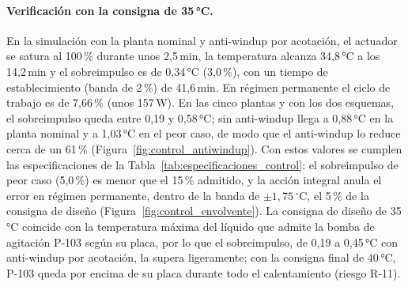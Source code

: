 \paragraph{Verificación con la consigna de 35\,°C.} En la simulación con la planta nominal y anti-windup por acotación, el actuador se satura al 100\,\% durante unos 2,5\,min, la temperatura alcanza 34,8\,°C a los 14,2\,min y el sobreimpulso es de 0,34\,°C (3,0\,\%), con un tiempo de establecimiento (banda de 2\,\%) de 41,6\,min. En régimen permanente el ciclo de trabajo es de 7,66\,\% (unos 157\,W). En las cinco plantas y con los dos esquemas, el sobreimpulso queda entre 0,19 y 0,58\,°C; sin anti-windup llega a 0,88\,°C en la planta nominal y a 1,03\,°C en el peor caso, de modo que el anti-windup lo reduce cerca de un 61\,\% (Figura~\ref{fig:control_antiwindup}). Con estos valores se cumplen las especificaciones de la Tabla~\ref{tab:especificaciones_control}: el sobreimpulso de peor caso (5,0\,\%) es menor que el 15\,\% admitido, y la acción integral anula el error en régimen permanente, dentro de la banda de $\pm 1{,}75\,^{\circ}\mathrm{C}$, el 5\,\% de la consigna de diseño (Figura~\ref{fig:control_envolvente}). La consigna de diseño de 35\,°C coincide con la temperatura máxima del líquido que admite la bomba de agitación P-103 según su placa, por lo que el sobreimpulso, de 0,19 a 0,45\,°C con anti-windup por acotación, la supera ligeramente; con la consigna final de 40\,°C, P-103 queda por encima de su placa durante todo el calentamiento (riesgo R-11).



